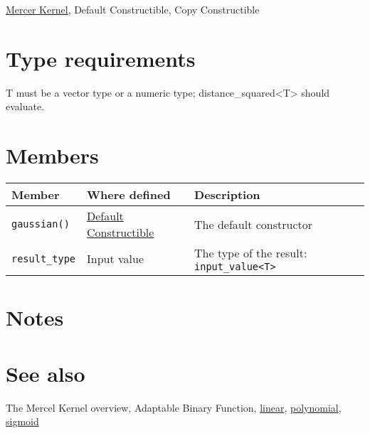 \documentclass{article}
\begin{document}
\href{\kmlroot/mercer_kernel.html}{Mercer Kernel}, 
Default Constructible, Copy Constructible


\section*{Type requirements}

T must be a vector type or a numeric type; distance_squared<T> should evaluate.


\section*{Members}

\begin{tabular}{lll}
\textbf{Member} & \textbf{Where defined} & \textbf{Description} \\ 
\hline
\texttt{gaussian()} & \href{http://www.sgi.com/tech/stl/DefaultConstructible.html}{Default Constructible} & The default constructor \\
\texttt{result_type} & Input value & The type of the result: \texttt{input_value<T>} \\
\end{tabular}

\section*{Notes}

\section*{See also}

The Mercel Kernel overview, Adaptable Binary Function, 
\href{\kmlroot/linear.html}{linear}, 
\href{\kmlroot/polynomial.html}{polynomial}, 
\href{\kmlroot/sigmoid.html}{sigmoid}



\end{document}
